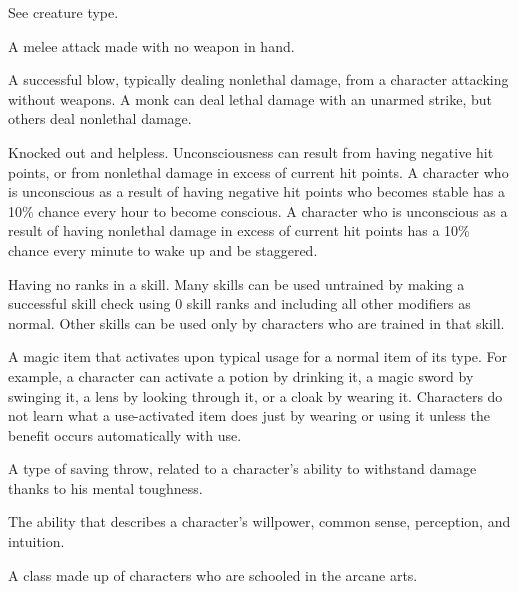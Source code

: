  See creature type. 

 A melee attack made with no weapon in hand. 

 A successful blow, typically dealing nonlethal 
damage, from a character attacking without weapons. A monk can 
deal lethal damage with an unarmed strike, but others deal 
nonlethal damage. 

 Knocked out and helpless. Unconsciousness can 
result from having negative hit points, or from 
nonlethal damage in excess of current hit points. A character who is 
unconscious as a result of having negative hit points who becomes stable has a 10\% chance every hour to become 
conscious. A character who is unconscious as a result of having 
nonlethal damage in excess of current hit points has a 10\% chance 
every minute to wake up and be staggered. 

 Having no ranks in a skill. Many skills can be used 
untrained by making a successful skill check using 0 skill ranks and 
including all other modifiers as normal. Other skills can be used 
only by characters who are trained in that skill. 

 A magic item that activates upon typical 
usage for a normal item of its type. For example, a character can 
activate a potion by drinking it, a magic sword by swinging it, a lens 
by looking through it, or a cloak by wearing it. Characters do not 
learn what a use-activated item does just by wearing or using it 
unless the benefit occurs automatically with use. 

 A type of saving throw, related to a character's ability 
to withstand damage thanks to his mental toughness. 

 The ability that describes a character's willpower, 
common sense, perception, and intuition. 

 A class made up of characters who are schooled in 
the arcane arts. 

